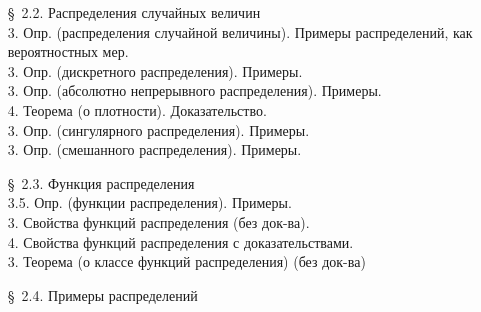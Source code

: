 \documentclass[10pt]{amsart}
\begin{document}
\begin{enumerate}
\begin{enumerate}
    
\item[\S\, 2.2.] Распределения случайных величин \\
3. Опр. (распределения случайной величины). Примеры распределений, как вероятностных мер. \\
3. Опр. (дискретного распределения). Примеры. \\
3. Опр. (абсолютно непрерывного распределения). Примеры. \\
4. Теорема (о плотности). Доказательство. \\
3. Опр. (сингулярного распределения). Примеры. \\
3. Опр. (смешанного распределения). Примеры. \\


\item[\S\, 2.3.] Функция распределения \\
    
3.5. Опр. (функции распределения). Примеры. \\
3. Свойства функций распределения (без док-ва). \\
4. Свойства функций распределения с доказательствами. \\
3. Теорема (о классе функций распределения) (без док-ва)\\


\item[\S\, 2.4.] Примеры распределений \\
    

\end{enumerate}
\end{enumerate}
\end{document}
